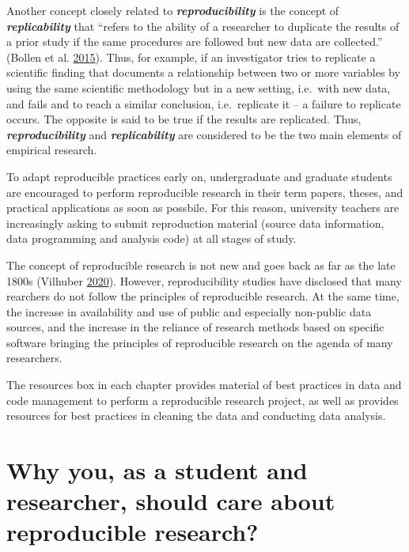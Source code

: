 \documentclass[
]{book}
\begin{document}
Another concept closely related to \textbf{\emph{reproducibility}} is
the concept of \textbf{\emph{replicability}} that ``refers to the
ability of a researcher to duplicate the results of a prior study if the
same procedures are followed but new data are collected.'' (Bollen et
al. \protect\hyperlink{ref-bollen_social_2015}{2015}). Thus, for
example, if an investigator tries to replicate a scientific finding that
documents a relationship between two or more variables by using the same
scientific methodology but in a new setting, i.e.~with new data, and
fails and to reach a similar conclusion, i.e.~replicate it -- a failure
to replicate occurs. The opposite is said to be true if the results are
replicated. Thus, \textbf{\emph{reproducibility}} and
\textbf{\emph{replicability}} are considered to be the two main elements
of empirical research.

To adapt reproducible practices early on, undergraduate and graduate
students are encouraged to perform reproducible research in their term
papers, theses, and practical applications as soon as possbile. For this
reason, university teachers are increasingly asking to submit
reproduction material (source data information, data programming and
analysis code) at all stages of study.

The concept of reproducible research is not new and goes back as far as
the late 1800s (Vilhuber
\protect\hyperlink{ref-vilhuber_reproducibility_2020}{2020}). However,
reproducibility studies have disclosed that many rearchers do not follow
the principles of reproducible research. At the same time, the increase
in availability and use of public and especially non-public data
sources, and the increase in the reliance of research methods based on
specific software bringing the principles of reproducible research on
the agenda of many researchers.

The resources box in each chapter provides material of best practices in
data and code management to perform a reproducible research project, as
well as provides resources for best practices in cleaning the data and
conducting data analysis.

\hypertarget{why-you-as-a-student-and-researcher-should-care-about-reproducible-research}{%
\section{Why you, as a student and researcher, should care about
reproducible
research?}\label{why-you-as-a-student-and-researcher-should-care-about-reproducible-research}}
\end{document}
